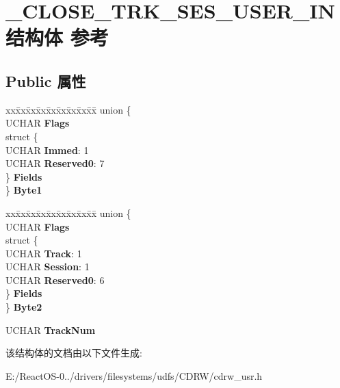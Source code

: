 \hypertarget{struct___c_l_o_s_e___t_r_k___s_e_s___u_s_e_r___i_n}{}\section{\+\_\+\+C\+L\+O\+S\+E\+\_\+\+T\+R\+K\+\_\+\+S\+E\+S\+\_\+\+U\+S\+E\+R\+\_\+\+I\+N结构体 参考}
\label{struct___c_l_o_s_e___t_r_k___s_e_s___u_s_e_r___i_n}
\subsection*{Public 属性}
\begin{DoxyCompactItemize}
\item 
\mbox{\label{struct___c_l_o_s_e___t_r_k___s_e_s___u_s_e_r___i_n_a2adaa87f4ee46eac3780358b01e6eb18}} 
\begin{tabbing}
xx\=xx\=xx\=xx\=xx\=xx\=xx\=xx\=xx\=\kill
union \{\\
\>UCHAR {\bfseries Flags}\\
\>struct \{\\
\>\>UCHAR {\bfseries Immed}: 1\\
\>\>UCHAR {\bfseries Reserved0}: 7\\
\>\} {\bfseries Fields}\\
\} {\bfseries Byte1}\\

\end{tabbing}\item 
\mbox{\label{struct___c_l_o_s_e___t_r_k___s_e_s___u_s_e_r___i_n_a6e9b54342d604abd3ba310f7188b8968}} 
\begin{tabbing}
xx\=xx\=xx\=xx\=xx\=xx\=xx\=xx\=xx\=\kill
union \{\\
\>UCHAR {\bfseries Flags}\\
\>struct \{\\
\>\>UCHAR {\bfseries Track}: 1\\
\>\>UCHAR {\bfseries Session}: 1\\
\>\>UCHAR {\bfseries Reserved0}: 6\\
\>\} {\bfseries Fields}\\
\} {\bfseries Byte2}\\

\end{tabbing}\item 
\mbox{\label{struct___c_l_o_s_e___t_r_k___s_e_s___u_s_e_r___i_n_a3dcd88e981535f7528013ef487c84c2f}} 
U\+C\+H\+AR {\bfseries Track\+Num}
\end{DoxyCompactItemize}


该结构体的文档由以下文件生成\+:\begin{DoxyCompactItemize}
\item 
E\+:/\+React\+O\+S-\/0../drivers/filesystems/udfs/\+C\+D\+R\+W/cdrw\+\_\+usr.\+h\end{DoxyCompactItemize}

